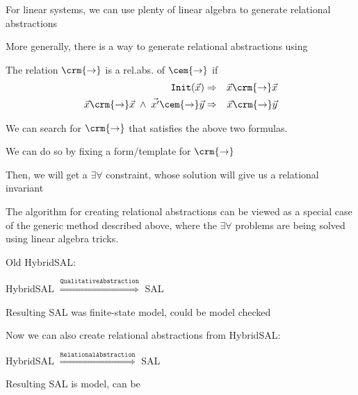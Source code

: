 \documentclass{seminar}
\begin{document}
\begin{slide}

For linear systems, we can use plenty of linear algebra
to {} generate relational abstractions

\medskip
More generally, there is a {} way to generate
relational abstractions using {}

\medskip
The relation $\crm{\rightarrow}$ is a rel.abs. of $\cem{\rightarrow}$ if
\begin{eqnarray*}
 \mathtt{Init}(\vec{x}) & \Rightarrow &  \vec{x} {\crm{\rightarrow}} \vec{x}
\\
 \vec{x} {\crm{\rightarrow}} \vec{x}  \;\wedge\;
 \vec{x'} {\cem{\rightarrow}} \vec{y}  & \Rightarrow &
 \vec{x} {\crm{\rightarrow}} \vec{y}
\end{eqnarray*}

We can search for $\crm{\rightarrow}$ that satisfies the above two formulas.

We can do so by fixing a form/template for $\crm{\rightarrow}$

Then, we will get a $\exists\forall$ constraint, whose solution will give us
a relational invariant

\end{slide}
\begin{slide}

The algorithm for creating relational abstractions can be viewed as
a special case of the generic method described above, where the
$\exists\forall$ problems are being solved using linear algebra tricks.

\end{slide}
\begin{slide}

Old HybridSAL:

\begin{center}
HybridSAL  $\stackrel{\mathtt{Qualitative Abstraction}}{\Longrightarrow}$ SAL
\end{center}
Resulting SAL was finite-state model, could be model checked


\bigskip
Now we can also create relational abstractions from HybridSAL:
\begin{center}
HybridSAL  $\stackrel{\mathtt{Relational Abstraction}}{\Longrightarrow}$ SAL
\end{center}
Resulting SAL is {} model, can be {}

\end{slide}
\end{document}
